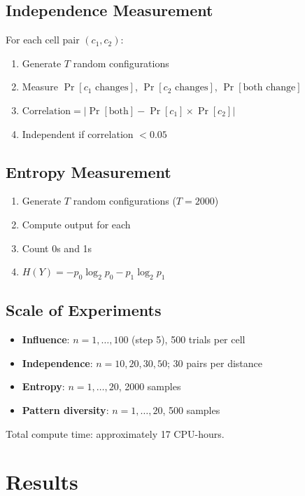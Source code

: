 \documentclass[11pt]{article}
\begin{document}
\subsection{Independence Measurement}

For each cell pair $(c_1, c_2)$:
\begin{enumerate}
    \item Generate $T$ random configurations
    \item Measure $\Pr[c_1 \text{ changes}]$, $\Pr[c_2 \text{ changes}]$, $\Pr[\text{both change}]$
    \item $\text{Correlation} = |\Pr[\text{both}] - \Pr[c_1] \times \Pr[c_2]|$
    \item Independent if correlation $< 0.05$
\end{enumerate}

\subsection{Entropy Measurement}

\begin{enumerate}
    \item Generate $T$ random configurations ($T = 2000$)
    \item Compute output for each
    \item Count 0s and 1s
    \item $H(Y) = -p_0 \log_2 p_0 - p_1 \log_2 p_1$
\end{enumerate}

\subsection{Scale of Experiments}

\begin{itemize}
    \item \textbf{Influence}: $n = 1,\ldots,100$ (step 5), 500 trials per cell
    \item \textbf{Independence}: $n = 10, 20, 30, 50$; 30 pairs per distance
    \item \textbf{Entropy}: $n = 1,\ldots,20$, 2000 samples
    \item \textbf{Pattern diversity}: $n = 1,\ldots,20$, 500 samples
\end{itemize}

Total compute time: approximately 17 CPU-hours.

\section{Results}
\end{document}
